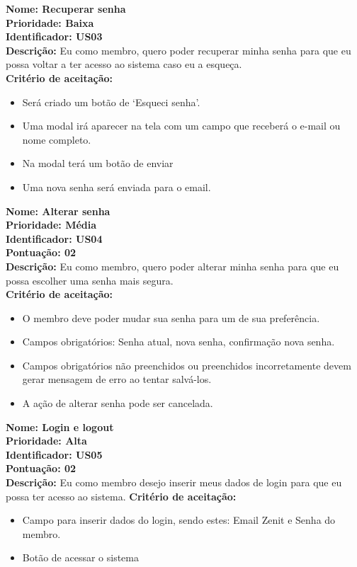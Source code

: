 \begin{anexosenv}
\indent \textbf{Nome: Recuperar senha\\
\indent Prioridade: Baixa\\
\indent Identificador: US03 \\
\indent Descrição: }Eu como membro, quero poder recuperar minha senha para que eu possa voltar a ter acesso ao sistema caso eu a esqueça.\\
\indent \textbf{Critério de aceitação:}
\begin{itemize}
    \item Será criado um botão de ‘Esqueci senha’.
    \item Uma modal irá aparecer na tela com um campo que receberá o e-mail ou nome completo.
    \item Na modal terá um botão de enviar
    \item Uma nova senha será enviada para o email.
\end{itemize}

\indent \textbf{Nome: Alterar senha\\
\indent Prioridade: Média\\
\indent Identificador: US04\\
\indent Pontuação: 02 \\
\indent Descrição: }Eu como membro, quero poder alterar minha senha para que eu possa escolher uma senha mais segura.\\
\indent \textbf{Critério de aceitação:}
\begin{itemize}
    \item O membro deve poder mudar sua senha para um de sua preferência.
    \item Campos obrigatórios: Senha atual, nova senha, confirmação nova senha.
    \item Campos obrigatórios não preenchidos ou preenchidos incorretamente devem gerar mensagem de erro ao tentar salvá-los.
    \item A ação de alterar senha pode ser cancelada.
\end{itemize}

\indent \textbf{Nome: Login e logout\\
\indent Prioridade: Alta\\
\indent Identificador: US05\\
\indent Pontuação: 02\\
\indent Descrição:} Eu como membro desejo inserir meus dados de login para que eu possa ter acesso ao sistema.
\indent \textbf{Critério de aceitação: }
\begin{itemize}
    \item Campo para inserir dados do login, sendo estes: Email Zenit e Senha do membro.
    \item Botão de acessar o sistema
\end{itemize}


\end{anexosenv}
